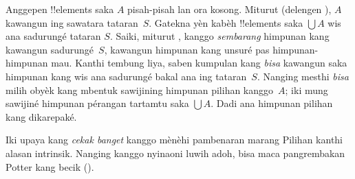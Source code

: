 \documentclass[../../../include/open-logic-section]{subfiles}
\begin{document}
Anggepen !!{element}s saka $A$ pisah-pisah lan ora kosong.
Miturut \stageshier{} (delengen ), $A$
kawangun ing sawatara tataran~$S$. Gatekna yèn kabèh !!{element}s
saka $\bigcup A$ wis ana sadurungé tataran $S$. Saiki, miturut
\stagesacc{}, kanggo \emph{sembarang} himpunan kang kawangun
sadurungé~$S$, kawangun himpunan kang unsuré pas himpunan-himpunan mau.
Kanthi tembung liya, saben kumpulan kang \emph{bisa} kawangun saka
himpunan kang wis ana sadurungé bakal ana ing tataran~$S$. Nanging
mesthi \emph{bisa} milih obyèk kang mbentuk sawijining himpunan
pilihan kanggo~$A$; iki mung sawijiné himpunan pérangan tartamtu
saka $\bigcup A$. Dadi ana himpunan pilihan kang dikarepaké.

Iki upaya kang \emph{cekak banget} kanggo mènèhi pambenaran marang Pilihan kanthi
alasan intrinsik. Nanging kanggo nyinaoni luwih
adoh, bisa maca pangrembakan Potter kang becik
(\citeyear[\S14.8]{Potter2004}).
\end{document}
